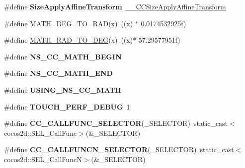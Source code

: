 \begin{DoxyCompactItemize}
\item 
\mbox{\label{group__base_gab1d40a014c106f103aa32191e9541978}} 
\#define {\bfseries Size\+Apply\+Affine\+Transform}~\hyperlink{group__base_ga40f990327de656e394d23b0650208008}{\+\_\+\+\_\+\+C\+C\+Size\+Apply\+Affine\+Transform}
\item 
\#define \hyperlink{group__base_gae2eab65745e7f093a97fbd4421261c84}{M\+A\+T\+H\+\_\+\+D\+E\+G\+\_\+\+T\+O\+\_\+\+R\+AD}(x)~((x) $\ast$ 0.\+0174532925f)
\item 
\#define \hyperlink{group__base_ga7144cae826260514e7a61f405c77e848}{M\+A\+T\+H\+\_\+\+R\+A\+D\+\_\+\+T\+O\+\_\+\+D\+EG}(x)~((x)$\ast$ 57.\+29577951f)
\item 
\mbox{\label{group__base_gaf66fbc3024a6ebf672e9270a52970aab}} 
\#define {\bfseries N\+S\+\_\+\+C\+C\+\_\+\+M\+A\+T\+H\+\_\+\+B\+E\+G\+IN}
\item 
\mbox{\label{group__base_gab9bcf41ee04aab8263ce6821976c3908}} 
\#define {\bfseries N\+S\+\_\+\+C\+C\+\_\+\+M\+A\+T\+H\+\_\+\+E\+ND}
\item 
\mbox{\label{group__base_ga816286195c50ca639ce83faf755c20ef}} 
\#define {\bfseries U\+S\+I\+N\+G\+\_\+\+N\+S\+\_\+\+C\+C\+\_\+\+M\+A\+TH}
\item 
\mbox{\label{group__base_gaabe4e43a30c4e67a327af2e2557274f9}} 
\#define {\bfseries T\+O\+U\+C\+H\+\_\+\+P\+E\+R\+F\+\_\+\+D\+E\+B\+UG}~1
\item 
\mbox{\label{group__base_ga93a3458e1b6e06e251b8ba774eeb7ad1}} 
\#define {\bfseries C\+C\+\_\+\+C\+A\+L\+L\+F\+U\+N\+C\+\_\+\+S\+E\+L\+E\+C\+T\+OR}(\+\_\+\+S\+E\+L\+E\+C\+T\+OR)~static\+\_\+cast$<$cocos2d\+::\+S\+E\+L\+\_\+\+Call\+Func$>$(\&\+\_\+\+S\+E\+L\+E\+C\+T\+OR)
\item 
\mbox{\label{group__base_ga0304dbc1f312ce25d4969490c869d09d}} 
\#define {\bfseries C\+C\+\_\+\+C\+A\+L\+L\+F\+U\+N\+C\+N\+\_\+\+S\+E\+L\+E\+C\+T\+OR}(\+\_\+\+S\+E\+L\+E\+C\+T\+OR)~static\+\_\+cast$<$cocos2d\+::\+S\+E\+L\+\_\+\+Call\+FuncN$>$(\&\+\_\+\+S\+E\+L\+E\+C\+T\+OR)
\item 
\mbox{\label{group__base_ga03e93bdcfd4468f47fc770c8e4bc6dd5}} 

\end{DoxyCompactItemize}
